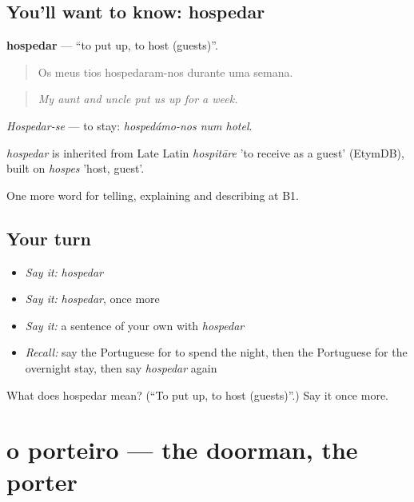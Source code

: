 \subsection*{You'll want to know: hospedar}
\textbf{hospedar} — \textquotedblleft{}to put up, to host (guests)\textquotedblright{}.

\begin{quote}
Os meus tios hospedaram-nos durante uma semana.
\end{quote}

\begin{quote}
\emph{My aunt and uncle put us up for a week.}
\end{quote}

\emph{Hospedar-se} — to stay: \emph{hospedámo-nos num hotel}.

\begin{cousinweb}
\emph{hospedar} is inherited from Late Latin \emph{hospitāre} 'to receive as a guest' (EtymDB), built on \emph{hospes} 'host, guest'.
\end{cousinweb}

\begin{grammarlens}[title={What you've built}]
One more word for telling, explaining and describing at B1.
\end{grammarlens}

\subsection*{Your turn}
\begin{itemize}
\raggedright
  \item \emph{Say it:} \emph{hospedar}
  \item \emph{Say it:} \emph{hospedar}, once more
  \item \emph{Say it:} a sentence of your own with \emph{hospedar}
  \item \emph{Recall:} say the Portuguese for to spend the night, then the Portuguese for the overnight stay, then say \emph{hospedar} again
\end{itemize}

\begin{tcolorbox}[breakable,colback=teal!4,colframe=teal!35!black,title={Before you move on}]
What does hospedar mean? (\textquotedblleft{}To put up, to host (guests)\textquotedblright{}.) Say it once more.
\end{tcolorbox}
\section[o porteiro]{o porteiro — the doorman, the porter}

